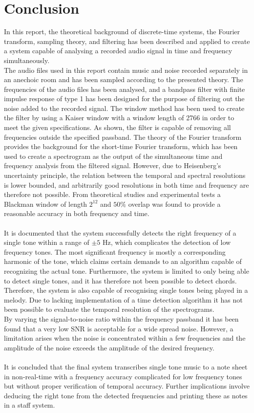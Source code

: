 \chapter{Conclusion}
In this report, the theoretical background of discrete-time systems, the Fourier transform, sampling theory, and filtering has been described and applied to create a system capable of analysing a recorded audio signal in time and frequency simultaneously.
\\
The audio files used in this report contain music and noise recorded separately in an anechoic room and has been sampled according to the presented theory. The frequencies of the audio files has been analysed, and a bandpass filter with finite impulse response of type 1 has been designed for the purpose of filtering out the noise added to the recorded signal. The window method has been used to create the filter by using a Kaiser window with a window length of 2766 in order to meet the given specifications. As shown, the filter is capable of removing all frequencies outside the specified passband. The theory of the Fourier transform provides the background for the short-time Fourier transform, which has been used to create a spectrogram as the output of the simultaneous time and frequency analysis from the filtered signal. However, due to Heisenberg's uncertainty principle, the relation between the temporal and spectral resolutions is lower bounded, and arbitrarily good resolutions in both time and frequency are therefore not possible. From theoretical studies and experimental tests a Blackman window of length $2^{12}$ and $50\%$ overlap was found to provide a reasonable accuracy in both frequency and time.
\\ \\
It is documented that the system successfully detects the right frequency of a single tone within a range of $\pm 5$ Hz, which complicates the detection of low frequency tones. The most significant frequency is mostly a corresponding harmonic of the tone, which claims certain demands to an algorithm capable of recognizing the actual tone. Furthermore, the system is limited to only being able to detect single tones, and it has therefore not been possible to detect chords. Therefore, the system is also capable of recognising single tones being played in a melody. Due to lacking implementation of a time detection algorithm it has not been possible to evaluate the temporal resolution of the spectrograms.
\\
By varying the signal-to-noise ratio within the frequency  passband it has been found that a very low SNR is acceptable for a wide spread noise. However, a limitation arises when the noise is concentrated within a few frequencies and the amplitude of the noise exceeds the amplitude of the desired frequency.
\\ \\
It is concluded that the final system transcribes single tone music to a note sheet in non-real-time with a frequency accuracy complicated for low frequency tones but without proper verification of temporal accuracy. Further implications involve deducing the right tone from the detected frequencies and printing these as notes in a staff system.

 
